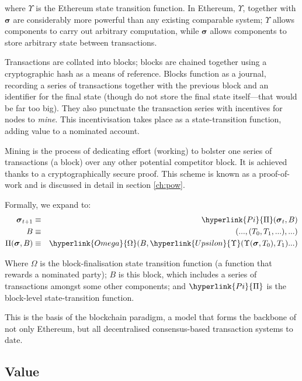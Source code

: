 \documentclass[9pt,oneside]{amsart}
\begin{document}
\begin{multicols}{2}
where $\Upsilon$ is the Ethereum state transition function. In Ethereum, $\Upsilon$, together with $\boldsymbol{\sigma}$ are considerably more powerful than any existing comparable system; $\Upsilon$ allows components to carry out arbitrary computation, while $\boldsymbol{\sigma}$ allows components to store arbitrary state between transactions.

Transactions are collated into blocks; blocks are chained together using a cryptographic hash as a means of reference. Blocks function as a journal, recording a series of transactions together with the previous block and an identifier for the final state (though do not store the final state itself---that would be far too big). They also punctuate the transaction series with incentives for nodes to \textit{mine}. This incentivisation takes place as a state-transition function, adding value to a nominated account.

Mining is the process of dedicating effort (working) to bolster one series of transactions (a block) over any other potential competitor block. It is achieved thanks to a cryptographically secure proof. This scheme is known as a proof-of-work and is discussed in detail in section \ref{ch:pow}.

Formally, we expand to:
\begin{eqnarray}
\boldsymbol{\sigma}_{t+1} & \equiv & \hyperlink{Pi}{\Pi}(\boldsymbol{\sigma}_{t}, B) \\
B & \equiv & (..., (T_0, T_1, ...), ...) \\
\Pi(\boldsymbol{\sigma}, B) & \equiv & \hyperlink{Omega}{\Omega}(B, \hyperlink{Upsilon}{\Upsilon}(\Upsilon(\boldsymbol{\sigma}, T_0), T_1) ...)
\end{eqnarray}

Where \hyperlink{Omega}{$\Omega$} is the block-finalisation state transition function (a function that rewards a nominated party); \hyperlink{block}{$B$} is this block, which includes a series of transactions amongst some other components; and $\hyperlink{Pi}{\Pi}$ is the block-level state-transition function.

This is the basis of the blockchain paradigm, a model that forms the backbone of not only Ethereum, but all decentralised consensus-based transaction systems to date.

\subsection{Value}


\end{multicols}
\end{document}
